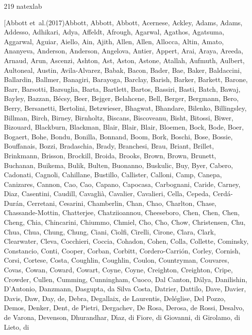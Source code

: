 \documentclass{aa}
\begin{document}
\begin{thebibliography}{219}
	\expandafter\ifx\csname natexlab\endcsname\relax\def\natexlab#1{#1}\fi
	
	\bibitem[{{Abbott} {et~al.}(2017){Abbott}, {Abbott}, {Abbott}, {Acernese}, {Ackley}, {Adams}, {Adams}, {Addesso}, {Adhikari}, {Adya}, {Affeldt}, {Afrough}, {Agarwal}, {Agathos}, {Agatsuma}, {Aggarwal}, {Aguiar}, {Aiello}, {Ain}, {Ajith}, {Allen}, {Allen}, {Allocca}, {Altin}, {Amato}, {Ananyeva}, {Anderson}, {Anderson}, {Angelova}, {Antier}, {Appert}, {Arai}, {Araya}, {Areeda}, {Arnaud}, {Arun}, {Ascenzi}, {Ashton}, {Ast}, {Aston}, {Astone}, {Atallah}, {Aufmuth}, {Aulbert}, {Aultoneal}, {Austin}, {Avila-Alvarez}, {Babak}, {Bacon}, {Bader}, {Bae}, {Baker}, {Baldaccini}, {Ballardin}, {Ballmer}, {Banagiri}, {Barayoga}, {Barclay}, {Barish}, {Barker}, {Barkett}, {Barone}, {Barr}, {Barsotti}, {Barsuglia}, {Barta}, {Bartlett}, {Bartos}, {Bassiri}, {Basti}, {Batch}, {Bawaj}, {Bayley}, {Bazzan}, {B{\'e}csy}, {Beer}, {Bejger}, {Belahcene}, {Bell}, {Berger}, {Bergmann}, {Bero}, {Berry}, {Bersanetti}, {Bertolini}, {Betzwieser}, {Bhagwat}, {Bhandare}, {Bilenko}, {Billingsley}, {Billman}, {Birch}, {Birney}, {Birnholtz},
		{Biscans}, {Biscoveanu}, {Bisht}, {Bitossi}, {Biwer}, {Bizouard}, {Blackburn}, {Blackman}, {Blair}, {Blair}, {Blair}, {Bloemen}, {Bock}, {Bode}, {Boer}, {Bogaert}, {Bohe}, {Bondu}, {Bonilla}, {Bonnand}, {Boom}, {Bork}, {Boschi}, {Bose}, {Bossie}, {Bouffanais}, {Bozzi}, {Bradaschia}, {Brady}, {Branchesi}, {Brau}, {Briant}, {Brillet}, {Brinkmann}, {Brisson}, {Brockill}, {Broida}, {Brooks}, {Brown}, {Brown}, {Brunett}, {Buchanan}, {Buikema}, {Bulik}, {Bulten}, {Buonanno}, {Buskulic}, {Buy}, {Byer}, {Cabero}, {Cadonati}, {Cagnoli}, {Cahillane}, {Bustillo}, {Callister}, {Calloni}, {Camp}, {Canepa}, {Canizares}, {Cannon}, {Cao}, {Cao}, {Capano}, {Capocasa}, {Carbognani}, {Caride}, {Carney}, {Diaz}, {Casentini}, {Caudill}, {Cavagli{\`a}}, {Cavalier}, {Cavalieri}, {Cella}, {Cepeda}, {Cerd{\'a}-Dur{\'a}n}, {Cerretani}, {Cesarini}, {Chamberlin}, {Chan}, {Chao}, {Charlton}, {Chase}, {Chassande-Mottin}, {Chatterjee}, {Chatziioannou}, {Cheeseboro}, {Chen}, {Chen}, {Chen}, {Cheng}, {Chia}, {Chincarini}, {Chiummo},
		{Chmiel}, {Cho}, {Cho}, {Chow}, {Christensen}, {Chu}, {Chua}, {Chua}, {Chung}, {Chung}, {Ciani}, {Ciolfi}, {Cirelli}, {Cirone}, {Clara}, {Clark}, {Clearwater}, {Cleva}, {Cocchieri}, {Coccia}, {Cohadon}, {Cohen}, {Colla}, {Collette}, {Cominsky}, {Constancio}, {Conti}, {Cooper}, {Corban}, {Corbitt}, {Cordero-Carri{\'o}n}, {Corley}, {Cornish}, {Corsi}, {Cortese}, {Costa}, {Coughlin}, {Coughlin}, {Coulon}, {Countryman}, {Couvares}, {Covas}, {Cowan}, {Coward}, {Cowart}, {Coyne}, {Coyne}, {Creighton}, {Creighton}, {Cripe}, {Crowder}, {Cullen}, {Cumming}, {Cunningham}, {Cuoco}, {Dal Canton}, {D{\'a}lya}, {Danilishin}, {D'Antonio}, {Danzmann}, {Dasgupta}, {da Silva Costa}, {Datrier}, {Dattilo}, {Dave}, {Davier}, {Davis}, {Daw}, {Day}, {de}, {Debra}, {Degallaix}, {de Laurentis}, {Del{\'e}glise}, {Del Pozzo}, {Demos}, {Denker}, {Dent}, {de Pietri}, {Dergachev}, {De Rosa}, {Derosa}, {de Rossi}, {Desalvo}, {de Varona}, {Devenson}, {Dhurandhar}, {D{\'\i}az}, {di Fiore}, {di Giovanni}, {di Girolamo}, {di Lieto}, {di
}}
\end{thebibliography}
\end{document}
